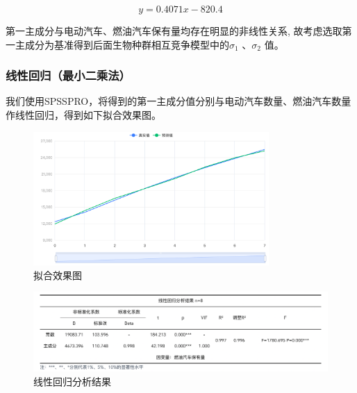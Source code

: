 \documentclass[12pt, a4paper, oneside]{ctexart}
\begin{document}
\begin{dmath}
  y=0.4071x-820.4
\end{dmath}


第一主成分与电动汽车、燃油汽车保有量均存在明显的非线性关系,
故考虑选取第一主成分为基准得到后面生物种群相互竞争模型中的$\sigma_1$
  、$\sigma_2$ 值。

\subsubsection{{线性回归（最小二乘法）}}

我们使用SPSSPRO，将得到的第一主成分值分别与电动汽车数量、燃油汽车数量作线性回归，得到如下拟合效果图。

\begin{figure}[H]
  \centering
  \includegraphics[width=0.8\textwidth]{pic/拟合效果图 (1).png}
  \caption{拟合效果图}
  \label{fig:拟合效果图}
\end{figure}

\begin{figure}[H]
  \centering
  \includegraphics[width=\textwidth]{pic/截屏2022-05-19 下午5.30.59.png}
  \caption{线性回归分析结果}
  \label{fig:线性回归分析结果}
\end{figure}
\end{document}
